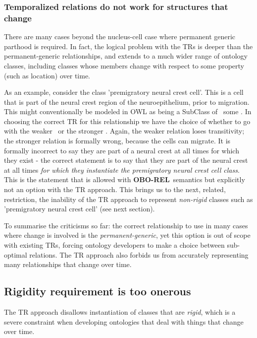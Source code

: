 \documentclass{bioinfo}
\def\partOf{\pr{part\_of}}
\def\atAllTimes{\pr{at-all-times}}
\def\atSomeTimes{\pr{at-some-times}}
\def\OBOREL{\textbf{OBO-REL}}
\begin{document}
\subsubsection{Temporalized relations do not work for structures that
  change}

There are many cases beyond the nucleus-cell case where permanent
generic parthood is required. In fact, the logical problem with the
TRs is deeper than the permanent-generic relationships, and extends to
a much wider range of ontology classes, including classes whose
members change with respect to some property (such as location) over
time.

As an example, consider the class 'premigratory neural crest
cell'. This is a cell that is part of the neural crest region of the
neuroepithelium, prior to migration. This might conventionally be
modeled in OWL as being a SubClass of \partOf\ some . In choosing the correct TR for this relationship we have the
choice of whether to go with the weaker \atSomeTimes\ or the stronger
\atAllTimes. Again, the weaker relation loses transitivity; the
stronger relation is formally wrong, because the cells can migrate. It
is formally incorrect to say they are part of a neural crest at all
times for which they exist - the correct statement is to say that they
are part of the neural crest at all times \emph{for which they
  instantiate the premigratory neural crest cell class}. This is the
statement that is allowed with \OBOREL\ semantics but explicitly not
an option with the TR approach. This brings us to the next, related,
restriction, the inability of the TR approach to represent
\emph{non-rigid} classes such as 'premigratory neural crest cell' (see
next section).

To summarise the criticisms so far: the correct relationship to use in
many cases where change is involved is the \emph{permanent-generic},
yet this option is out of scope with existing TRs, forcing ontology
developers to make a choice between sub-optimal relations. The TR
approach also forbids us from accurately representing many
relationships that change over time.

\subsection{Rigidity requirement is too onerous}

The TR approach disallows instantiation of classes that are
\emph{rigid}, which is a severe constraint when developing ontologies
that deal with things that change over time.
\end{document}
